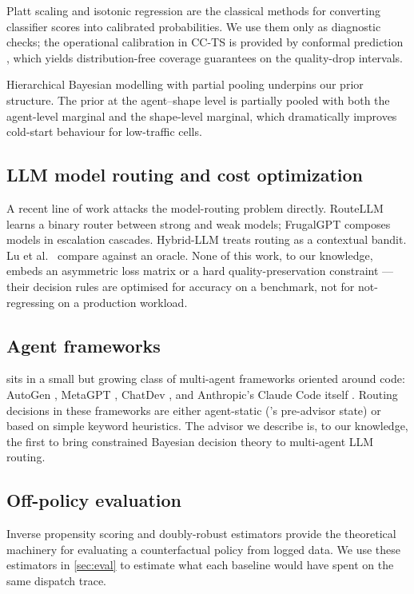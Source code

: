 Platt scaling \cite{platt1999probabilistic} and isotonic regression
\cite{zadrozny2002transforming} are the classical methods for converting
classifier scores into calibrated probabilities. We use them only as
diagnostic checks; the operational calibration in CC-TS is provided by
conformal prediction \cite{vovk2005algorithmic,shafer2008tutorial,angelopoulos2021gentle},
which yields distribution-free coverage guarantees on the
quality-drop intervals.

Hierarchical Bayesian modelling with partial pooling
\cite{gelman2013bayesian} underpins our prior structure. The prior at the
agent--shape level is partially pooled with both the agent-level marginal
and the shape-level marginal, which dramatically improves cold-start
behaviour for low-traffic cells.

\subsection{LLM model routing and cost optimization}

A recent line of work attacks the model-routing problem directly.
RouteLLM \cite{ong2024routellm} learns a binary router between strong and
weak models; FrugalGPT \cite{chen2023frugalgpt} composes models in
escalation cascades. Hybrid-LLM \cite{ding2024hybrid} treats routing as a
contextual bandit. Lu et al.\ \cite{lu2024routing} compare against an
oracle. None of this work, to our knowledge, embeds an asymmetric loss
matrix or a hard quality-preservation constraint --- their decision rules
are optimised for accuracy on a benchmark, not for not-regressing on a
production workload.

\subsection{Agent frameworks}

\blackrim sits in a small but growing class of multi-agent frameworks
oriented around code: AutoGen \cite{wu2023autogen}, MetaGPT
\cite{hong2023metagpt}, ChatDev \cite{qian2023communicative}, and
Anthropic's Claude Code itself
\cite{anthropic2024claudecode}. Routing decisions in these frameworks are
either agent-static (\blackrim's pre-advisor state) or based on simple
keyword heuristics. The advisor we describe is, to our knowledge, the
first to bring constrained Bayesian decision theory to multi-agent LLM
routing.

\subsection{Off-policy evaluation}

Inverse propensity scoring \cite{horvitz1952generalization,dudik2011doubly}
and doubly-robust estimators
\cite{dudik2014doubly,jiang2016doubly,thomas2016data} provide the
theoretical machinery for evaluating a counterfactual policy from logged
data. We use these estimators in \cref{sec:eval} to estimate what each
baseline would have spent on the same dispatch trace.
